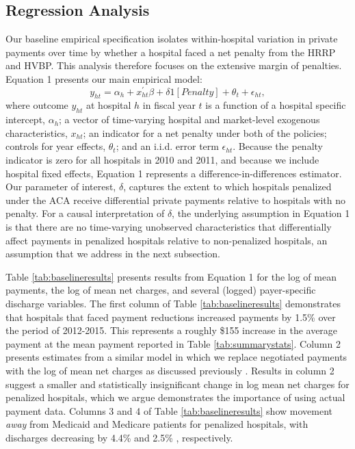\documentclass[12pt]{article}
\begin{document}
\subsection{Regression Analysis}
Our baseline empirical specification isolates within-hospital variation in private payments over time by whether a hospital faced a net penalty from the HRRP and HVBP. This analysis therefore focuses on the extensive margin of penalties.  Equation 1 presents our main empirical model:
\begin{equation}
\label{eq: reg}
y_{ht} = \alpha_{h} + x^{'}_{ht}\beta + \delta1[Penalty]  + \theta_{t}  +  \epsilon_{ht},
\end{equation}
where outcome $y_{ht}$ at hospital $h$ in fiscal year $t$ is a function of a hospital specific intercept, $\alpha_{h}$; a vector of time-varying hospital and market-level exogenous characteristics, $x_{ht}$; an indicator for a net penalty under both of the policies; controls for year effects, $\theta_t$; and an i.i.d. error term $\epsilon_{ht}$.  Because the penalty indicator is zero for all hospitals in 2010 and 2011, and because we include hospital fixed effects, Equation 1 represents a difference-in-differences estimator. Our parameter of interest, $\delta$, captures the extent to which hospitals penalized under the ACA receive differential private payments relative to hospitals with no penalty.  For a causal interpretation of $\delta$, the underlying assumption in Equation 1 is that there are no time-varying unobserved characteristics that differentially affect payments in penalized hospitals relative to non-penalized hospitals, an assumption that we address in the next subsection.

Table \ref{tab:baselineresults} presents results from Equation 1 for the log of mean payments, the log of mean net charges, and several (logged) payer-specific discharge variables. The first column of Table \ref{tab:baselineresults} demonstrates that hospitals that faced payment reductions increased payments by 1.5\% over the period of 2012-2015.  This represents a roughly \$155 increase in the average payment at the mean payment reported in Table \ref{tab:summarystats}.  Column 2 presents estimates from a similar model in which we replace negotiated payments with the log of mean net charges as discussed previously \citep{dafny2009,lewis2015,schmitt2017,dranove2017}. Results in column 2 suggest a smaller and statistically insignificant change in log mean net charges for penalized hospitals, which we argue demonstrates the importance of using actual payment data.  Columns 3 and 4 of Table \ref{tab:baselineresults} show movement \textit{away} from Medicaid and Medicare patients for penalized hospitals, with discharges decreasing by 4.4\% and 2.5\% , respectively.
\end{document}
